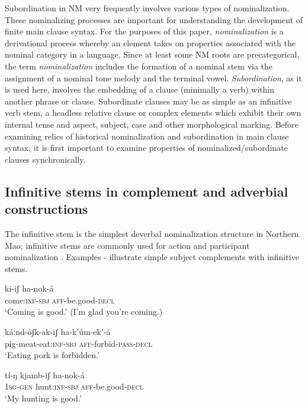 \documentclass[output=paper]{langsci/langscibook}
\begin{document}
Subordination in NM very frequently involves various types of nominalization. These nominalizing processes are important for understanding the development of finite main clause syntax. For the purposes of this paper, \textit{nominalization} is a derivational process whereby an element takes on properties associated with the nominal category in a language. Since at least some NM roots are precategorical, the term \textit{nominalization} includes the formation of a nominal stem via the assignment of a nominal tone melody and the terminal vowel. \textit{Subordination}, as it is used here, involves the embedding of a clause (minimally a verb) within another phrase or clause. Subordinate clauses may be as simple as an infinitive verb stem, a headless relative clause or complex elements which exhibit their own internal tense and aspect, subject, case and other morphological marking. Before examining relics of historical nominalization and subordination in main clause syntax, it is first important to examine properties of nominalized/subordinate clauses synchronically.

\subsection{Infinitive stems in complement and adverbial constructions}\label{sec:mahland:2.1}

  The infinitive stem is the simplest deverbal nominalization structure in Northern Mao; infinitive stems are commonly used for action and participant nominalization \citep[222]{Ahland2012}. Examples - illustrate simple subject complements with infinitive stems. 

\ea\label{ex:mahland:33}
\gll ki-iʃ                 ha-nok-á   \\
come:\textsc{inf-sbj}     \textsc{aff}{}-be.good-\textsc{decl} \\
\glt `Coming is good.' (I'm glad you're coming.)
\z

\ea\label{ex:mahland:34}
\gll káːnd-óʃk-ak-iʃ          ha-k'úm-{\downstep}ek'-á\\
pig-meat-eat:\textsc{inf-sbj}   \textsc{aff}{}-forbid-\textsc{pass-decl} \\
\glt `Eating pork is forbidden.'
\z

\ea\label{ex:mahland:35}
\gll tí-ŋ         kjamb-ìʃ         ha-nok-á  \\
\textsc{1sg-gen}    hunt:\textsc{inf-sbj}  \textsc{aff}{}-be.good-\textsc{decl} \\
\glt `My hunting is good.'
\z
\end{document}
